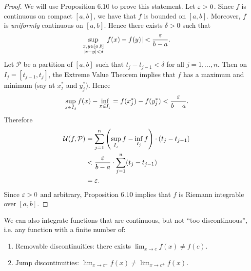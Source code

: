 \documentclass[class=article, crop=false]{standalone}
\begin{document}
  \begin{proof}
    We will use Proposition $6.10$ to prove this statement. Let $\varepsilon > 0$. Since $f$ is continuous on compact $[a, b]$, we have that $f$ is bounded on $[a, b]$. Moreover, $f$ is \emph{uniformly} continuous on $[a, b]$. Hence there exists $\delta > 0$ such that
    \[
      \sup_{\substack{x, y\in [a, b]\\ \left\lvert x - y \right\rvert<\delta}} \left\lvert f(x) - f(y) \right\rvert < \frac{\varepsilon}{b - a}.
    \]
    Let $\mathcal{P}$ be a partition of $[a, b]$ such that $t_j - t_{j - 1} < \delta$ for all $j = 1,\dotsc,n$. Then on $I_j = [t_{j - 1}, t_j]$, the Extreme Value Theorem implies that $f$ has a maximum and minimum (say at $x_j^*$ and $y_j^*$). Hence
    \[
      \sup_{x\in I_j}f(x) - \inf_{x\in I_j} = f(x_j^*) - f(y_j^*) < \frac{\varepsilon}{b - a}.
    \]
    Therefore
    \begin{align*}
      \mathcal{U}(f, \mathcal{P}) &= \sum_{j=1}^{n} \left( \sup_{I_j} f - \inf_{I_j}f \right)\cdot (t_j - t_{j - 1}) \\
                                  &< \frac{\varepsilon}{b - a}\cdot \sum_{j=1}^{n}(t_j - t_{j - 1}) \\
                                  &= \varepsilon.
    \end{align*}
    Since $\varepsilon > 0$ and arbitrary, Proposition $6.10$ implies that $f$ is Riemann integrable over $[a, b]$.
  \end{proof}
  \begin{note}{}
    We can also integrate functions that are continuous, but not ``too discontinuous'', i.e. any function with a finite number of:
    \begin{enumerate}[label=(\alph*)]
      \item Removable discontinuities: there exists $\displaystyle \lim_{x\to c} f(x)\neq f(c)$.
      \item Jump discontinuities: $\displaystyle \lim_{x\to c^-} f(x)\neq \lim_{x\to c^+} f(x)$.
    \end{enumerate}
  \end{note}
\end{document}
